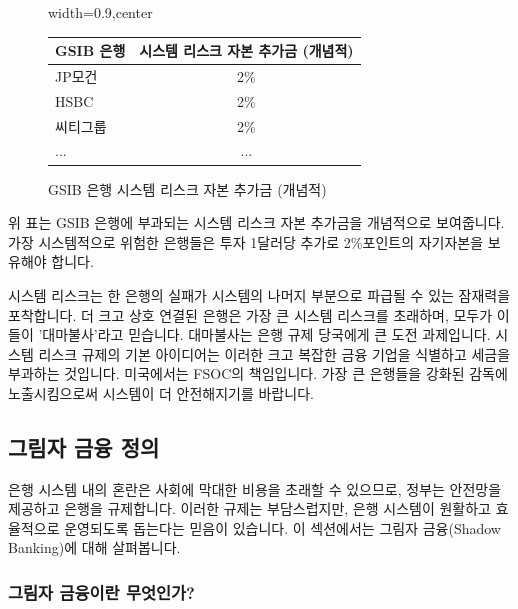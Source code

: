 \documentclass[11pt,a4paper]{book}
\theoremstyle{definition}
\begin{document}
\begin{figure}[h!]
    \centering
    \begin{adjustbox}{width=0.9\textwidth,center}
    \begin{tabular}{lc}
        \toprule
        \textbf{GSIB 은행} & \textbf{시스템 리스크 자본 추가금 (개념적)} \\
        \midrule
        JP모건 & 2\% \\
        HSBC & 2\% \\
        씨티그룹 & 2\% \\
        ... & ... \\
        \bottomrule
    \end{tabular}
    \end{adjustbox}
    \caption{GSIB 은행 시스템 리스크 자본 추가금 (개념적)}
    \label{tab:gsib_surcharges}
\end{figure}
\vspace{0.5em}
위 표는 GSIB 은행에 부과되는 시스템 리스크 자본 추가금을 개념적으로 보여줍니다. 가장 시스템적으로 위험한 은행들은 투자 1달러당 추가로 2\%포인트의 자기자본을 보유해야 합니다.

\begin{summarybox}[title=대마불사 요약]
시스템 리스크는 한 은행의 실패가 시스템의 나머지 부분으로 파급될 수 있는 잠재력을 포착합니다. 더 크고 상호 연결된 은행은 가장 큰 시스템 리스크를 초래하며, 모두가 이들이 '대마불사'라고 믿습니다. 대마불사는 은행 규제 당국에게 큰 도전 과제입니다. 시스템 리스크 규제의 기본 아이디어는 이러한 크고 복잡한 금융 기업을 식별하고 세금을 부과하는 것입니다. 미국에서는 FSOC의 책임입니다. 가장 큰 은행들을 강화된 감독에 노출시킴으로써 시스템이 더 안전해지기를 바랍니다.
\end{summarybox}


\subsection{그림자 금융 정의}

은행 시스템 내의 혼란은 사회에 막대한 비용을 초래할 수 있으므로, 정부는 안전망을 제공하고 은행을 규제합니다. 이러한 규제는 부담스럽지만, 은행 시스템이 원활하고 효율적으로 운영되도록 돕는다는 믿음이 있습니다. 이 섹션에서는 그림자 금융(Shadow Banking)에 대해 살펴봅니다.

\subsubsection{그림자 금융이란 무엇인가?}
\end{document}
